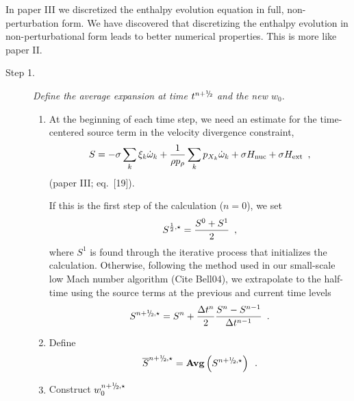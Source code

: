 In paper III we discretized the enthalpy evolution equation in full, non-perturbation form.  
We have discovered that discretizing the enthalpy evolution in non-perturbational form 
leads to better numerical properties.  This is more like paper II.\\


\begin{description}

\item[Step 1.] {\em Define the average expansion at time $t^\nph$ and the new $w_0.$}

\begin{enumerate}
\renewcommand{\theenumi}{{\bf \alph{enumi}}}

\item At the beginning of each time step, we need an estimate for the time-centered
source term in the velocity divergence constraint,
\begin{equation}
  S =  -\sigma  \sum_k  \xi_k \dot{\omega}_k  + 
  \frac{1}{\rho p_\rho} \sum_k p_{X_k}  {\dot{\omega}}_k  + \sigma {H_{\rm nuc}} + \sigma {H_{\rm ext}} \enskip ,
\label{eq:defineS} 
\end{equation}
(paper III; eq.~[19]).

If this is the first step of the calculation ($n=0$), we set
\begin{equation}
S^{\frac{1}{2},\star} = \frac{S^0 + S^1}{2} \enskip ,
\end{equation}
where $S^1$ is found through the iterative process that initializes the calculation.
Otherwise, following the method used in our small-scale low Mach number algorithm
(Cite Bell04), we extrapolate to the half-time using the source
terms at the previous and current time levels
\begin{equation}
S^{\nph,\star} = S^n + \frac{\Delta t^n}{2} \frac{S^n - S^{n-1}}{\Delta t^{n-1}} \enskip .
\end{equation}

\item Define
\begin{equation}
\overline{S}^{\nph,\star} = {\mathrm{\bf Avg}} \left(S^{\nph,\star}\right) \enskip .
\end{equation}

\item Construct $w_0^{\nph,\star}$


\end{enumerate}
\end{description}
